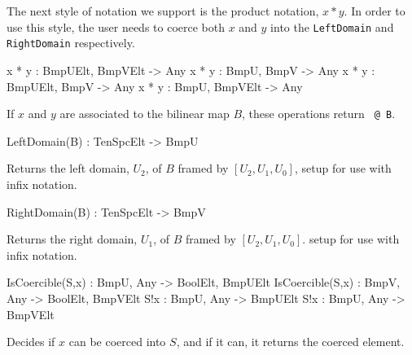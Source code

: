 The next style of notation we support is the product notation, $x*y$.
In order to use this style, the user needs to coerce both $x$ and $y$ into the {\tt LeftDomain} and {\tt RightDomain} respectively. 

\begin{intrinsics}
x * y : BmpUElt, BmpVElt -> Any
x * y : BmpU, BmpV -> Any
x * y : BmpUElt, BmpV -> Any
x * y : BmpU, BmpVElt -> Any
\end{intrinsics}

If $x$ and $y$ are associated to the bilinear map $B$, these operations return 
{\tt <x,y> @ B}.

\begin{intrinsics}
LeftDomain(B) : TenSpcElt -> BmpU
\end{intrinsics}

Returns the left domain, $U_2$, of $B$ framed by $[U_2,U_1,U_0]$, 
setup for use with infix notation.

\begin{intrinsics}
RightDomain(B) : TenSpcElt -> BmpV
\end{intrinsics}

Returns the right domain, $U_1$, of $B$  framed by $[U_2,U_1,U_0]$. 
setup for use with infix notation.

\begin{intrinsics}
IsCoercible(S,x) : BmpU, Any -> BoolElt, BmpUElt
IsCoercible(S,x) : BmpV, Any -> BoolElt, BmpVElt
S!x : BmpU, Any -> BmpUElt
S!x : BmpU, Any -> BmpVElt
\end{intrinsics}

Decides if $x$ can be coerced into $S$, and if it can, it returns the coerced 
element.

